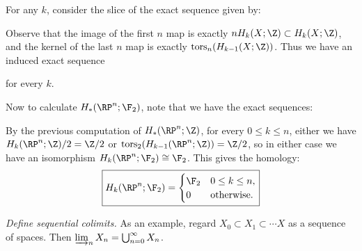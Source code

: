 \documentclass[11pt,letterpaper]{article}
\begin{document}
\begin{solution}
    \quad For any $k$, consider the slice of the exact sequence given by:
    \begin{center}
    \end{center}
    Observe that the image of the first $n$ map is exactly $n H_k(X;\Z) \subset H_{k}(X; \Z)$, and the kernel of the last $n$ map is exactly $\text{tors}_n(H_{k-1}(X; \Z))$. Thus we have an induced exact sequence
    \begin{center}
    \end{center}
    for every $k$.

    \quad Now to calculate $H_*(\RP^n; \F_2)$, note that we have the exact sequences:
    \begin{center}
    \end{center}
    By the previous computation of $H_*(\RP^n; \Z)$, for every $0\leq k\leq n$, either we have$H_k(\RP^n; \Z) /2 = \Z /2$ or $\text{tors}_2(H_{k-1}(\RP^n; \Z))=\Z /2$, so in either case we have an isomorphism $H_k(\RP^n; \F_2)\cong \F_2$. This gives the homology:
    \[
        \boxed{H_k(\RP^n; \F_2) = \begin{cases}
            \F_2 & 0\leq k\leq n,\\
            0 & \text{otherwise}.
        \end{cases}}
    \]   
\end{solution}

\begin{problem}
    \emph{Define sequential colimits.} As an example, regard $X_0\subset X_1\subset \cdots X$ as a sequence of spaces. Then $\varinjlim_n X_n = \bigcup^\infty_{n=0} X_n$.
\end{problem}
\end{document}
